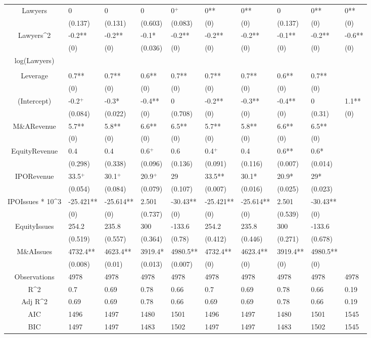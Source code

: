 \documentclass{article}
\begin{document}
\begin{table}[H]
\begin{tabular}{|clllllllll|}
Lawyers & 0 & 0 & 0 & 0$^{+}$ & 0** & 0** & 0 & 0** & 0** \\ 
   & (0.137) & (0.131) & (0.603) & (0.083) & (0) & (0) & (0.137) & (0) & (0) \\ 
  Lawyers^2 & -0.2** & -0.2** & -0.1* & -0.2** & -0.2** & -0.2** & -0.1** & -0.2** & -0.6** \\ 
   & (0) & (0) & (0.036) & (0) & (0) & (0) & (0) & (0) & (0) \\ 
  log(Lawyers) &  &  &  &  &  &  &  &  &  \\ 
   &  &  &  &  &  &  &  &  &  \\ 
  Leverage & 0.7** & 0.7** & 0.6** & 0.7** & 0.7** & 0.7** & 0.6** & 0.7** &  \\ 
   & (0) & (0) & (0) & (0) & (0) & (0) & (0) & (0) &  \\ 
  (Intercept) & -0.2$^{+}$ & -0.3* & -0.4** & 0 & -0.2** & -0.3** & -0.4** & 0 & 1.1** \\ 
   & (0.084) & (0.022) & (0) & (0.708) & (0) & (0) & (0) & (0.31) & (0) \\ 
  M\&ARevenue & 5.7** & 5.8** & 6.6** & 6.5** & 5.7** & 5.8** & 6.6** & 6.5** &  \\ 
   & (0) & (0) & (0) & (0) & (0) & (0) & (0) & (0) &  \\ 
  EquityRevenue & 0.4 & 0.4 & 0.6$^{+}$ & 0.6 & 0.4$^{+}$ & 0.4 & 0.6** & 0.6* &  \\ 
   & (0.298) & (0.338) & (0.096) & (0.136) & (0.091) & (0.116) & (0.007) & (0.014) &  \\ 
  IPORevenue & 33.5$^{+}$ & 30.1$^{+}$ & 20.9$^{+}$ & 29 & 33.5** & 30.1* & 20.9* & 29* &  \\ 
   & (0.054) & (0.084) & (0.079) & (0.107) & (0.007) & (0.016) & (0.025) & (0.023) &  \\ 
  IPOIssues * 10^3 & -25.421** & -25.614** & 2.501 & -30.43** & -25.421** & -25.614** & 2.501 & -30.43** &  \\ 
   & (0) & (0) & (0.737) & (0) & (0) & (0) & (0.539) & (0) &  \\ 
  EquityIssues & 254.2 & 235.8 & 300 & -133.6 & 254.2 & 235.8 & 300 & -133.6 &  \\ 
   & (0.519) & (0.557) & (0.364) & (0.78) & (0.412) & (0.446) & (0.271) & (0.678) &  \\ 
  M\&AIssues & 4732.4** & 4623.4** & 3919.4* & 4980.5** & 4732.4** & 4623.4** & 3919.4** & 4980.5** &  \\ 
   & (0.008) & (0.01) & (0.013) & (0.007) & (0) & (0) & (0) & (0) &  \\ 
  \hline 
 Observations & 4978 & 4978 & 4978 & 4978 & 4978 & 4978 & 4978 & 4978 & 4978 \\ 
  R^2 & 0.7 & 0.69 & 0.78 & 0.66 & 0.7 & 0.69 & 0.78 & 0.66 & 0.19 \\ 
  Adj R^2 & 0.69 & 0.69 & 0.78 & 0.66 & 0.69 & 0.69 & 0.78 & 0.66 & 0.19 \\ 
  AIC & 1496 & 1497 & 1480 & 1501 & 1496 & 1497 & 1480 & 1501 & 1545 \\ 
  BIC & 1497 & 1497 & 1483 & 1502 & 1497 & 1497 & 1483 & 1502 & 1545 \\ 
   \hline
\end{tabular}
 

\end{table}
\end{document}
